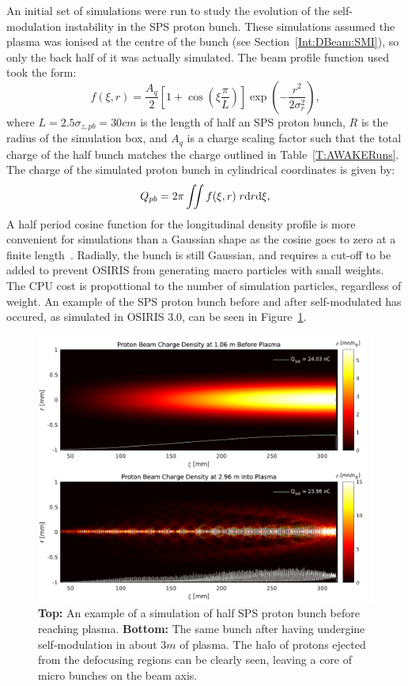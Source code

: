 An initial set of simulations were run to study the evolution of the self-modulation instability in the SPS proton bunch.
These simulations assumed the plasma was ionised at the centre of the bunch (see Section~\ref{Int:DBeam:SMI}), so only the back half of it was actually simulated.
The beam profile function used took the form:
\begin{equation}
    f(\xi,r) = \frac{A_{q}}{2} \left[1 + \cos\left(\xi\frac{\pi}{L}\right)\right] \exp\left(-\frac{r^{2}}{2\sigma_{r}^{2}}\right), \label{EQ:SPS-Profile}
\end{equation}
where $L = 2.5\sigma_{z,pb} = 30\unit{cm}$ is the length of half an SPS proton bunch, $R$ is the radius of the simulation box, and $A_{q}$ is a charge scaling factor such that the total charge of the half bunch matches the charge outlined in Table~\ref{T:AWAKERuns}.
The charge of the simulated proton bunch in cylindrical coordinates is given by:
\begin{equation}
    Q_{pb} = 2\pi \iint f(\xi,r) \;r \mathrm{d} r \mathrm{d} \xi, \label{EQ:SPS-Charge}
\end{equation}
A half period cosine function for the longitudinal density profile is more convenient for simulations than a Gaussian shape as the cosine goes to zero at a finite length~\cite{lotov:2010}.
Radially, the bunch is still Gaussian, and requires a cut-off to be added to prevent OSIRIS from generating macro particles with small weights.
The CPU cost is propottional to the number of simulation particles, regardless of weight.
An example of the SPS proton bunch before and after self-modulated has occured, as simulated in OSIRIS 3.0, can be seen in Figure~\ref{Fig:Sim:SMI}.

\begin{figure}[hbt]
    \centering
    \includegraphics[width=1.0\linewidth]{figures/PBSelfModulationBefAft}
    \caption{\label{Fig:Sim:SMI}
        \textbf{Top:} An example of a simulation of half SPS proton bunch before reaching plasma.
        \textbf{Bottom:} The same bunch after having undergine self-modulation in about $3\unit{m}$ of plasma.
        The halo of protons ejected from the defocusing regions can be clearly seen, leaving a core of micro bunches on the beam axis.
    }
\end{figure}

